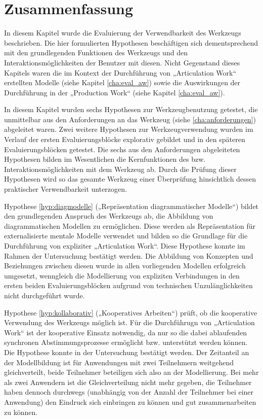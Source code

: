 \section{Zusammenfassung}
\label{sec:t_zusammenfassung}

In diesem Kapitel wurde die Evaluierung der Verwendbarkeit des Werkzeugs beschrieben. Die hier formulierten Hypothesen beschäftigen sich dementsprechend mit den grundlegenden Funktionen des Werkzeugs und den Interaktionsmöglichkeiten der Benutzer mit diesen. Nicht Gegenstand dieses Kapitels waren die im Kontext der Durchführung von „Articulation Work“ erstellten Modelle (siehe Kapitel \ref{cha:eval_aw}) sowie die Auswirkungen der Durchführung in der „Production Work“ (siehe Kapitel \ref{cha:eval_aw}).

In diesem Kapitel wurden sechs Hypothesen zur Werkzeugbenutzung getestet, die unmittelbar aus den Anforderungen an das Werkzeug (siehe \ref{cha:anforderungen}) abgeleitet waren. Zwei weitere Hypothesen zur Werkzeugverwendung wurden im Verlauf der ersten Evaluierungsblöcke explorativ gebildet und in den späteren Evaluierungsblöcken getestet. Die sechs aus den Anforderungen abgeleiteten Hypothesen bilden im Wesentlichen die Kernfunktionen des bzw. Interaktionsmöglichkeiten mit dem Werkzeug ab. Durch die Prüfung dieser Hypothesen wird so das gesamte Werkzeug einer Überprüfung hinsichtlich dessen praktischer Verwendbarkeit unterzogen.

Hypothese \ref{hyp:diagmodelle} („Repräsentation diagrammatischer Modelle“) bildet den grundlegenden Anspruch des Werkzeugs ab, die Abbildung von diagrammatischen Modellen zu ermöglichen. Diese werden als Repräsentation für externalisierte mentale Modelle verwendet und bilden so die Grundlage für die Durchführung von expliziter „Articulation Work“. Diese Hypothese konnte im Rahmen der Untersuchung bestätigt werden. Die Abbildung von Konzepten und Beziehungen zwischen diesen wurde in allen vorliegenden Modellen erfolgreich umgesetzt, wenngleich die Modellierung von expliziten Verbindungen in den ersten beiden Evaluierungsblöcken aufgrund von technischen Unzulänglichkeiten nicht durchgeführt wurde.

Hypothese \ref{hyp:kollaborativ} („Kooperatives Arbeiten“) prüft, ob die kooperative Verwendung des Werkzeugs möglich ist. Für die Durchführugn von „Articulation Work“ ist der kooperative Einsatz notwendig, da nur so die dabei ablaufenden synchronen Abstimmungsprozesse ermöglicht bzw. unterstützt werden können. Die Hypothese konnte in der Untersuchung bestätigt werden. Der Zeitanteil an der Modellbildung ist für Anwendungen mit zwei Teilnehmern weitgehend gleichverteilt, beide Teilnehmer beteiligen sich also an der Modellierung. Bei mehr als zwei Anwendern ist die Gleichverteilung nicht mehr gegeben, die Teilnehmer haben dennoch durchwegs (unabhängig von der Anzahl der Teilnehmer bei einer Anwendung) den Eindruck sich einbringen zu können und gut zusammenarbeiten zu können.

